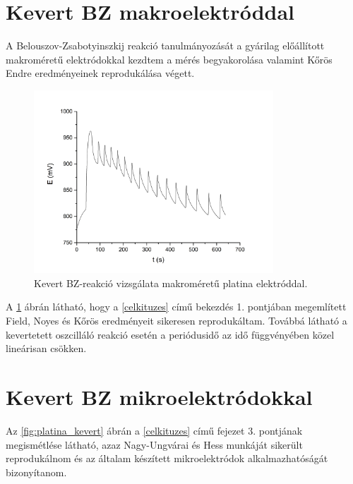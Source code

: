 \section{Kevert BZ makroelektróddal}
A Belouszov-Zsabotyinszkij reakció tanulmányozását a gyárilag előállított makroméretű elektródokkal kezdtem a mérés begyakorolása valamint Kőrös Endre eredményeinek \cite{noyes1972oscillations} reprodukálása végett. 
\begin{figure}[h]
\centering
\includegraphics[width=0.8\textwidth]{img/makroelektrod.jpg}
\caption{Kevert BZ-reakció vizsgálata makroméretű platina elektróddal.}
\label{fig:makroelektrod}
\end{figure}
A \ref{fig:makroelektrod} ábrán látható, hogy a \ref{celkituzes} című bekezdés 1. pontjában megemlített Field, Noyes és Kőrös eredményeit \cite{noyes1972oscillations} sikeresen reprodukáltam. Továbbá látható a kevertetett oszcilláló reakció esetén a periódusidő az idő függvényében közel lineárisan csökken. 

\section{Kevert BZ mikroelektródokkal}

Az \ref{fig:platina_kevert} ábrán a \ref{celkituzes} című fejezet 3. pontjának megismétlése látható, azaz Nagy-Ungvárai és Hess munkáját sikerült reprodukálnom és az általam készített mikroelektródok alkalmazhatóságát bizonyítanom.

